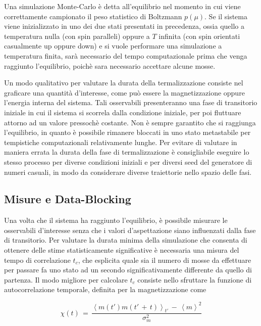 Una simulazione Monte-Carlo è detta all'equilibrio nel momento in cui viene correttamente campionato il peso statistico di Boltzmann 
$p\left(\mu\right)$. Se il sistema viene inizializzato in uno dei due stati presentati in precedenza, ossia quello a temperatura 
nulla (con spin paralleli) oppure a $T$ infinita (con spin orientati casualmente up oppure down) e si vuole performare una simulazione a 
temperatura finita, sarà necessario del tempo computazionale prima che venga raggiunto l'equilibrio, poichè sara necessario accettare 
alcune mosse.

Un modo qualitativo per valutare la durata della termalizzazione consiste nel graficare una quantità d'interesse, 
come può essere la magnetizzazione oppure l'energia interna del sistema. Tali osservabili presenteranno una fase di transitorio 
iniziale in cui il sistema si scorrela dalla condizione iniziale, per poi fluttuare attorno ad un valore pressochè costante. Non è 
sempre garantito che si raggiunga l'equilibrio, in quanto è possibile rimanere bloccati in uno stato metastabile per tempistiche 
computazionali relativamente lunghe. Per evitare di valutare in maniera errata la durata della fase di termalizzazione è consigliabile 
eseguire lo stesso processo per diverse condizioni iniziali e per diversi seed del generatore di numeri casuali, in modo da considerare 
diverse traiettorie nello spazio delle fasi.  




\subsection{Misure e Data-Blocking}

Una volta che il sistema ha raggiunto l'equilibrio, è possibile misurare le osservabili d'interesse senza che i valori d'aspettazione 
siano influenzati dalla fase di transitorio. Per valutare la durata minima della simulazione che consenta di ottenere delle stime 
statisticamente significative è necessaria una misura del tempo di correlazione $t_c$, che esplicita quale sia il numero di mosse 
da effettuare per passare fa uno stato ad un secondo significativamente differente da quello di partenza. Il modo migliore per 
calcolare $t_c$ consiste nello sfruttare la funzione di autocorrelazione temporale, definita per la magnetizzazione come 

\begin{equation}
    \chi\left(t\right)\,=\,\frac{\left<m\left(t'\right)m\left(t'\,+\,t\right)\right>_{t'}\,-\,\left<m\right>^2}{\sigma^2_m}
    \label{eq: auto_corr_m}
\end{equation}

